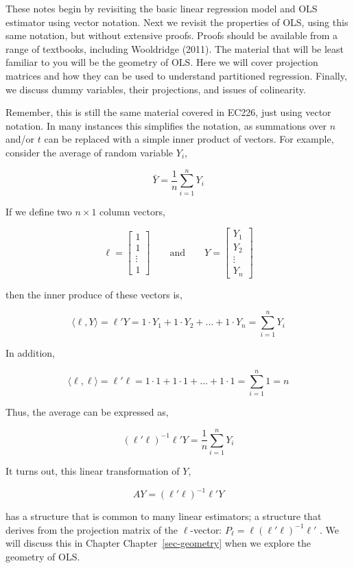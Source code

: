 \documentclass[
  letterpaper,
  DIV=11,
  numbers=noendperiod]{scrreprt}
\begin{document}
These notes begin by revisiting the basic linear regression model and
OLS estimator using vector notation. Next we revisit the properties of
OLS, using this same notation, but without extensive proofs. Proofs
should be available from a range of textbooks, including Wooldridge
(2011). The material that will be least familiar to you will be the
geometry of OLS. Here we will cover projection matrices and how they can
be used to understand partitioned regression. Finally, we discuss dummy
variables, their projections, and issues of colinearity.

Remember, this is still the same material covered in EC226, just using
vector notation. In many instances this simplifies the notation, as
summations over \(n\) and/or \(t\) can be replaced with a simple inner
product of vectors. For example, consider the average of random variable
\(Y_i\),

\[
\bar{Y} = \frac{1}{n}\sum_{i=1}^{n}Y_i
\]

If we define two \(n\times 1\) column vectors,

\[
\ell = \begin{bmatrix}1 \\ 1 \\ \vdots \\ 1\end{bmatrix}\qquad \text{and}\qquad Y = \begin{bmatrix}Y_1 \\ Y_2 \\ \vdots \\ Y_n\end{bmatrix}
\]

then the inner produce of these vectors is,

\[
\langle\ell,Y\rangle = \ell'Y = 1\cdot Y_1+1\cdot Y_2+\dots+1\cdot Y_n = \sum_{i=1}^{n}Y_i
\]

In addition,

\[
\langle\ell,\ell\rangle = \ell'\ell = 1\cdot 1+1\cdot 1+\dots+1\cdot 1 = \sum_{i=1}^{n}1 = n
\]

Thus, the average can be expressed as,

\[
(\ell'\ell)^{-1}\ell'Y = \frac{1}{n}\sum_{i=1}^{n}Y_i
\]

It turns out, this linear transformation of \(Y\),

\[
AY = (\ell'\ell)^{-1}\ell'Y
\]

has a structure that is common to many linear estimators; a structure
that derives from the projection matrix of the \(\ell\)-vector:
\(P_{\ell} =\ell(\ell'\ell)^{-1}\ell'\) . We will discuss this in
Chapter Chapter~\ref{sec-geometry} when we explore the geometry of OLS.
\end{document}
